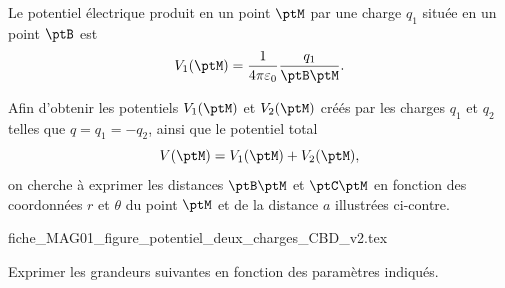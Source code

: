                                 \initialisationPartieGauche %
% 

Le potentiel électrique produit en un point $\ptM$ par une charge $q_1$ située en un point $\ptB$ est 
\[
V_1(\ptM) = \frac{1}{4\pi\varepsilon_0}\frac{q_1}{\ptB\ptM}.
\]

Afin d'obtenir les potentiels $V_1(\ptM)$ et $V_2(\ptM)$ créés par les charges $q_1$ et $q_2$ telles que $q = q_1 = -q_2$, ainsi que le potentiel total 
\[
V(\ptM) = V_1(\ptM) + V_2(\ptM),
\]
on cherche à exprimer les distances $\ptB\ptM$ et $\ptC\ptM$ en fonction des coordonnées $r$ et $\theta$ du point $\ptM$ et de la distance $a$ illustrées ci-contre.


\initialisationPartieDroite %
\begin{center}
	{fiche_MAG01_figure_potentiel_deux_charges_CBD_v2.tex}
\end{center}
                               \finalisationDuPartageDePage %

\vspace{1mm}


Exprimer les grandeurs suivantes en fonction des paramètres indiqués.



\debutEntrainement



